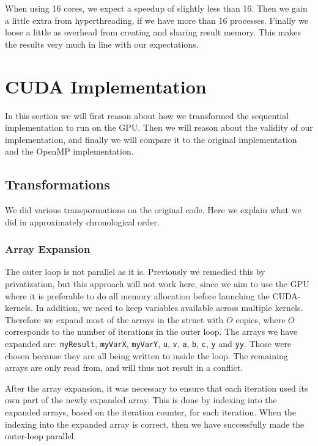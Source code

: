 \documentclass[11pt]{article}
\begin{document}
When using 16 cores, we expect a speedup of slightly less than 16. Then we 
gain a little extra from hyperthreading, if we have more than 16 processes. 
Finally we loose a little as overhead from creating and sharing result memory.
This makes the results very much in line with our expectations.


\section{CUDA Implementation}
In this section we will first reason about how we transformed the sequential
implementation to run on the GPU. Then we will reason about the validity of 
our implementation, and finally we will compare it to the original 
implementation and the OpenMP implementation.

\subsection{Transformations}
We did various transpormations on the original code. Here we explain what we 
did in approximately chronological order.

\subsubsection{Array Expansion}
The outer loop is not parallel as it is. Previously we remedied this by privatization,
but this approach will not work here, since we aim to use the GPU where
it is preferable to do all memory allocation before launching the CUDA-kernels.
In addition, we need to keep variables available across multiple kernels. Therefore we
expand most of the arrays in the struct with $O$ copies, where $O$ corresponds to
the number of iterations in the outer loop. The arrays we have expanded are:
\texttt{myResult}, \texttt{myVarX}, \texttt{myVarY}, \texttt{u}, \texttt{v}, \texttt{a}, \texttt{b}, \texttt{c}, \texttt{y} and \texttt{yy}. Those were chosen because 
they are all being written to inside the loop. The remaining arrays are only 
read from, and will thus not result in a conflict. 

After the array expansion,
it was necessary to ensure that each iteration used its own part of the newly
expanded array. This is done by indexing into the expanded arrays, based on the
iteration counter, for each iteration. When the indexing into the expanded
array is correct, then we have successfully made the outer-loop parallel.
\end{document}
